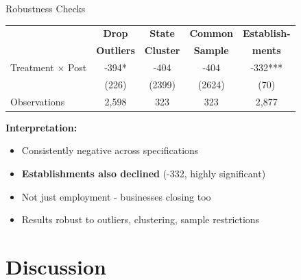 \documentclass[aspectratio=169]{beamer}
\begin{document}
\begin{frame}{Robustness Checks}
\begin{table}
\footnotesize
\begin{tabular}{lcccc}
\toprule
 & \textbf{Drop} & \textbf{State} & \textbf{Common} & \textbf{Establish-} \\
 & \textbf{Outliers} & \textbf{Cluster} & \textbf{Sample} & \textbf{ments} \\
\midrule
Treatment $\times$ Post & -394* & -404 & -404 & -332*** \\
 & (226) & (2399) & (2624) & (70) \\
\addlinespace
Observations & 2,598 & 323 & 323 & 2,877 \\
\bottomrule
\end{tabular}
\end{table}

\vspace{0.3cm}

\textbf{Interpretation:}
\begin{itemize}
    \item Consistently negative across specifications
    \item \textbf{Establishments also declined} (-332, highly significant)
    \item Not just employment - businesses closing too
    \item Results robust to outliers, clustering, sample restrictions
\end{itemize}
\end{frame}

\section{Discussion}
\end{document}
